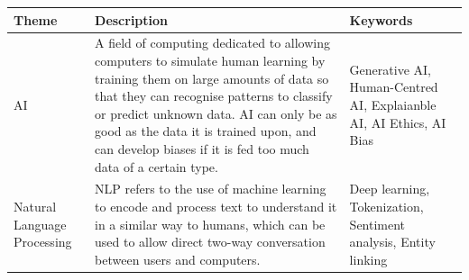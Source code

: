 \documentclass[12pt]{report}
\begin{document}
\pagebreak
    \begin{table}[H]
        \centering
        \begin{tabular}{|p{}|p{} | p{}|}
            \hline
            \cellcolor{blue!25}Theme & \cellcolor{blue!25}Description &
            \cellcolor{blue!25}Keywords \\

            \hline

            AI & A field of computing dedicated to allowing computers to simulate human
            learning by training them on large amounts of data so that they can recognise patterns to classify or 
            predict unknown data. AI can only be as good as the data it is trained upon, and can 
            develop biases if it is fed too much data of a certain type. & Generative AI, 
            Human-Centred AI, Explaianble AI, AI Ethics, AI Bias \\



            \hline

            Natural Language Processing & NLP refers to the use of machine learning to encode and 
            process text to understand it in a similar way to humans, which can be used to allow direct 
            two-way conversation between users and computers. & Deep learning, Tokenization, Sentiment analysis,
            Entity linking


\end{tabular}
\end{table}
\end{document}
